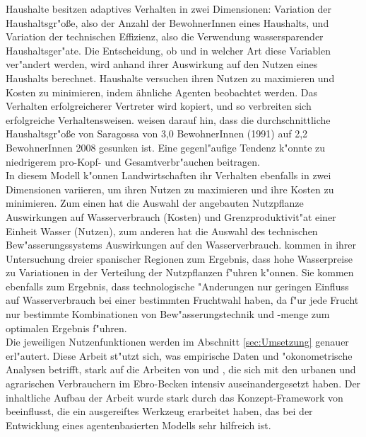 \documentclass[11pt,a4paper]{article}
\begin{document}
Haushalte besitzen adaptives Verhalten in zwei Dimensionen: Variation der Haushaltsgr"oße, also der Anzahl der BewohnerInnen eines Haushalts, und Variation der technischen Effizienz, also die Verwendung wassersparender Haushaltsger"ate. Die Entscheidung, ob und in welcher Art diese Variablen ver"andert werden, wird anhand ihrer Auswirkung auf den Nutzen eines Haushalts berechnet. Haushalte versuchen ihren Nutzen zu maximieren und Kosten zu minimieren, indem ähnliche Agenten beobachtet werden. Das Verhalten erfolgreicherer Vertreter wird kopiert, und so verbreiten sich erfolgreiche Verhaltensweisen. \cite{Arbues2010} weisen darauf hin, dass die durchschnittliche Haushaltsgr"oße von Saragossa von 3,0 BewohnerInnen (1991) auf 2,2 BewohnerInnen 2008 gesunken ist. Eine gegenl"aufige Tendenz k"onnte zu niedrigerem pro-Kopf- und Gesamtverbr"auchen beitragen. \\
In diesem Modell k"onnen Landwirtschaften ihr Verhalten ebenfalls in zwei Dimensionen variieren, um ihren Nutzen zu maximieren und ihre Kosten zu minimieren. Zum einen hat die Auswahl der angebauten Nutz\-pflanze Auswirkungen auf Wasserverbrauch (Kosten) und Grenzproduktivit"at einer Einheit Wasser (Nutzen), zum anderen hat die Auswahl des technischen Bew"asserungssystems Auswirkungen auf den Wasserverbrauch. \cite{Varela-Ortega1998} kommen in ihrer Untersuchung dreier spanischer Regionen zum Ergebnis, dass hohe Wasserpreise zu Variationen in der Verteilung der Nutzpflanzen f"uhren k"onnen. Sie kommen ebenfalls zum Ergebnis, dass technologische "Anderungen nur geringen Einfluss auf Wasserverbrauch bei einer bestimmten Fruchtwahl haben, da f"ur jede Frucht nur bestimmte Kombinationen von Bew"asserungstechnik und -menge zum optimalen Ergebnis f"uhren.\\

Die jeweiligen Nutzenfunktionen werden im Abschnitt \ref{sec:Umsetzung} genauer erl"autert. Diese Arbeit st"utzt sich, was empirische Daten und "okonometrische Analysen betrifft, stark auf die Arbeiten von \cite{Arbues2010} und \cite{Salvador2011}, die sich mit den urbanen und agrarischen Verbrauchern im Ebro-Becken intensiv auseinandergesetzt haben. Der inhaltliche Aufbau der Arbeit wurde stark durch das Konzept-Framework von \cite{Grimm2010} beeinflusst, die ein ausgereiftes Werkzeug erarbeitet haben, das bei der Entwicklung eines agentenbasierten Modells sehr hilfreich ist.
\end{document}
